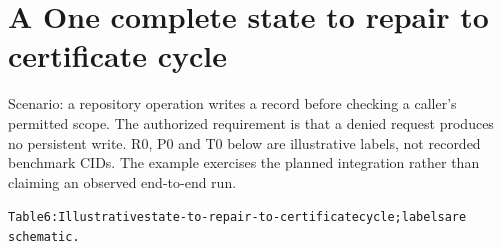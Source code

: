 \documentclass{article}
\begin{document}
\clearpage
\section*{A One complete state to repair to certificate cycle}
Scenario: a repository operation writes a record before checking a caller’s permitted scope. The
authorized requirement is that a denied request produces no persistent write. R0, P0 and T0 below
are illustrative labels, not recorded benchmark CIDs. The example exercises the planned integration
rather than claiming an observed end-to-end run.

\begingroup\fontsize{7}{8.4}\selectfont
\begin{alltt}
Table 6: Illustrative state-to-repair-to-certificate cycle; labels are
schematic.
\end{alltt}\endgroup
\end{document}
